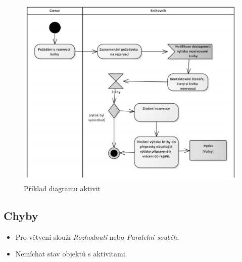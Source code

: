 \documentclass{szzclass}
\begin{document}
\begin{figure}[ht!]
\centering
\includegraphics[width=.75\linewidth]{topics/bi-wsi-si-18/images/diagram-aktivit.png}
\caption{Příklad diagramu aktivit}
\end{figure}

\subsection{Chyby}
\begin{itemize}
\item Pro větvení slouží \emph{Rozhodnutí} nebo \emph{Paralelní souběh}.
\item Nemíchat stav objektů s aktivitami.
\end{itemize}
\end{document}
